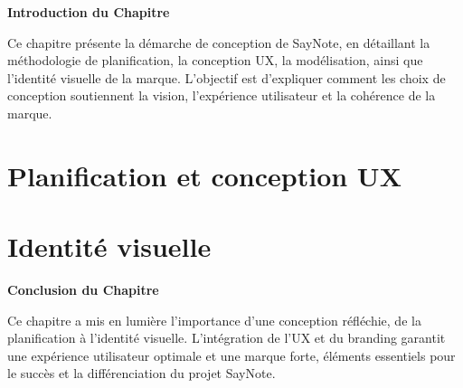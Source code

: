 
\begin{center}
\textbf{\large Introduction du Chapitre}
\end{center}

\noindent
Ce chapitre présente la démarche de conception de SayNote, en détaillant la méthodologie de planification, la conception UX, la modélisation, ainsi que l'identité visuelle de la marque. L'objectif est d'expliquer comment les choix de conception soutiennent la vision, l'expérience utilisateur et la cohérence de la marque.

\section{Planification et conception UX}


\section{Identité visuelle}


\vspace{1cm}
\begin{center}
\textbf{\large Conclusion du Chapitre}
\end{center}

\noindent
Ce chapitre a mis en lumière l'importance d'une conception réfléchie, de la planification à l'identité visuelle. L'intégration de l'UX et du branding garantit une expérience utilisateur optimale et une marque forte, éléments essentiels pour le succès et la différenciation du projet SayNote.
